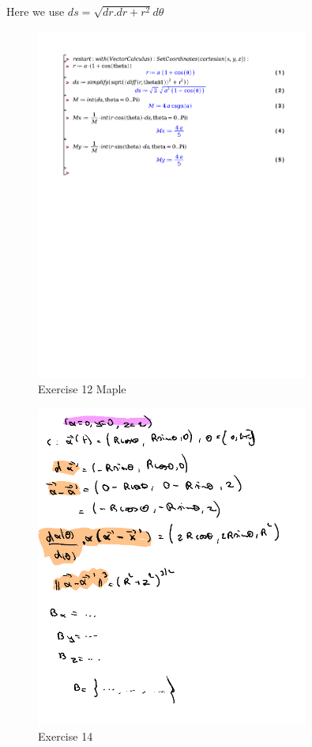 \documentclass[a4paper]{report}
\begin{document}
Here we use $ds = \sqrt{dr . dr + r^2} d\theta$

\begin{figure}[H]
	\centering
	\includegraphics[width=0.8\textwidth]{exercises/huis_6_ex_12.pdf}
	\caption{Exercise 12 Maple}
	\label{fig:huis_6_ex_12_maple}
\end{figure}

\begin{figure}[H]
	\centering
	\includegraphics[width=0.8\textwidth]{assets/2024-11-10-11-45-23.png}
	\caption{Exercise 14}
	\label{fig:2024-11-10-11-45-23}
\end{figure}
\end{document}
